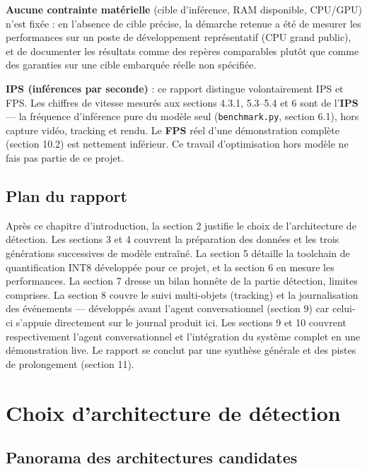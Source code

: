 \documentclass[11pt,a4paper]{article}
\let\Oldsubsection\subsection
\renewcommand{\subsection}{\FloatBarrier\Oldsubsection}
\begin{document}
    \textbf{Aucune contrainte matérielle} (cible d'inférence, RAM
    disponible, CPU/GPU) n'est fixée : en l'absence de cible précise, la
    démarche retenue a été de mesurer les performances sur un poste de
    développement représentatif (CPU grand public), et de documenter les
    résultats comme des repères comparables plutôt que comme des garanties
    sur une cible embarquée réelle non spécifiée.
    
    \textbf{IPS (inférences par seconde)} : ce rapport distingue
    volontairement IPS et FPS. Les chiffres de vitesse mesurés aux sections
    4.3.1, 5.3--5.4 et 6 sont de l'\textbf{IPS} --- la fréquence
    d'inférence pure du modèle seul (\texttt{benchmark.py}, section 6.1),
    hors capture vidéo, tracking et rendu. Le \textbf{FPS} réel d'une
    démonstration complète (section 10.2) est nettement inférieur. Ce travail d'optimisation hors modèle ne fais pas partie de ce projet.
    
    \subsection{Plan du rapport}
    
    Après ce chapitre d'introduction, la section 2 justifie le choix de
    l'architecture de détection. Les sections 3 et 4 couvrent la
    préparation des données et les trois générations successives de
    modèle entraîné. La section 5 détaille la toolchain de quantification
    INT8 développée pour ce projet, et la section 6 en mesure les
    performances. La section 7 dresse un bilan honnête de la partie
    détection, limites comprises. La section 8 couvre le suivi multi-objets
    (tracking) et la journalisation des événements --- développés avant
    l'agent conversationnel (section 9) car celui-ci s'appuie directement
    sur le journal produit ici. Les sections 9 et 10 couvrent respectivement
    l'agent conversationnel et l'intégration du système complet en une
    démonstration live. Le rapport se conclut par une synthèse générale et
    des pistes de prolongement (section 11).
    
    \section{Choix d'architecture de détection}
    
    \subsection{Panorama des architectures candidates}
    \label{sec:panorama}
    
\end{document}
